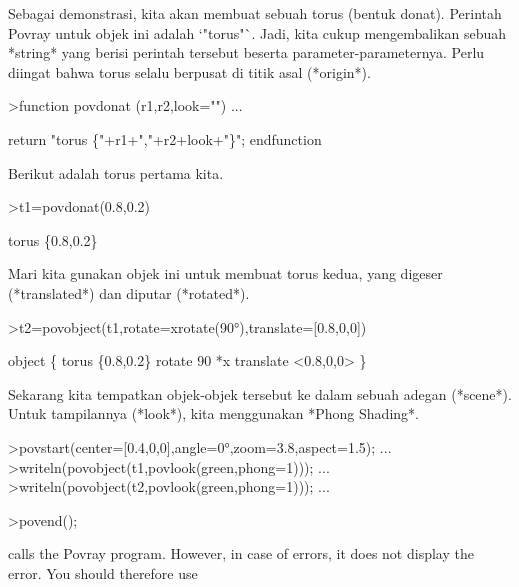 \documentclass{article}
\newenvironment{eulernotebook}{\par}{\par}
\newenvironment{eulercomment}{\par\medskip}{\par\medskip}
\begin{document}
\begin{eulernotebook}
\begin{eulercomment}
Sebagai demonstrasi, kita akan membuat sebuah torus (bentuk donat).
Perintah Povray untuk objek ini adalah `"torus"`. Jadi, kita cukup
mengembalikan sebuah *string* yang berisi perintah tersebut beserta
parameter-parameternya. Perlu diingat bahwa torus selalu berpusat di
titik asal (*origin*).
\end{eulercomment}
\begin{eulerprompt}
>function povdonat (r1,r2,look="") ...
\end{eulerprompt}
\begin{eulerudf}
    return "torus \{"+r1+","+r2+look+"\}";
  endfunction
\end{eulerudf}
\begin{eulercomment}
Berikut adalah torus pertama kita.
\end{eulercomment}
\begin{eulerprompt}
>t1=povdonat(0.8,0.2)
\end{eulerprompt}
\begin{euleroutput}
  torus \{0.8,0.2\}
\end{euleroutput}
\begin{eulercomment}
Mari kita gunakan objek ini untuk membuat torus kedua, yang digeser
(*translated*) dan diputar (*rotated*).
\end{eulercomment}
\begin{eulerprompt}
>t2=povobject(t1,rotate=xrotate(90°),translate=[0.8,0,0])
\end{eulerprompt}
\begin{euleroutput}
  object \{ torus \{0.8,0.2\}
   rotate 90 *x 
   translate <0.8,0,0>
   \}
\end{euleroutput}
\begin{eulercomment}
Sekarang kita tempatkan objek-objek tersebut ke dalam sebuah adegan
(*scene*). Untuk tampilannya (*look*), kita menggunakan *Phong
Shading*.
\end{eulercomment}
\begin{eulerprompt}
>povstart(center=[0.4,0,0],angle=0°,zoom=3.8,aspect=1.5); ...
>writeln(povobject(t1,povlook(green,phong=1))); ...
>writeln(povobject(t2,povlook(green,phong=1))); ...
\end{eulerprompt}
\begin{eulerttcomment}
 >povend();
\end{eulerttcomment}
\begin{eulercomment}
calls the Povray program. However, in case of errors, it does not
display the error. You should therefore use


\end{eulercomment}
\end{eulernotebook}
\end{document}
